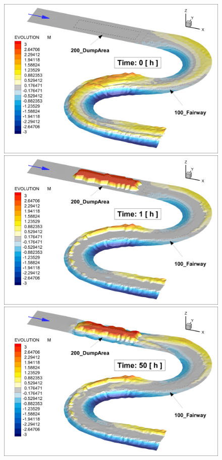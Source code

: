 \begin{figure} [!h]
\centering
\includegraphics[scale=0.14]{../img/critDig_Poly_000h.png}
\includegraphics[scale=0.14]{../img/critDig_Poly_001h.png}
\includegraphics[scale=0.14]{../img/critDig_Poly_050h.png}

\end{figure}
